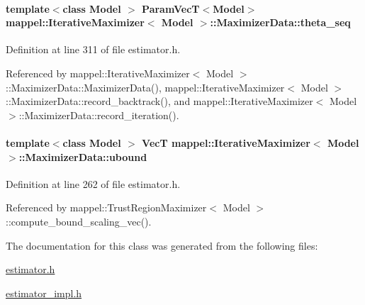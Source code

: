 \paragraph[{\texorpdfstring{theta\+\_\+seq}{theta_seq}}]{\setlength{\rightskip}{0pt plus 5cm}template$<$class Model $>$ {\bf Param\+VecT}$<$Model$>$ {\bf mappel\+::\+Iterative\+Maximizer}$<$ Model $>$\+::Maximizer\+Data\+::theta\+\_\+seq\hspace{0.3cm}{\ttfamily [protected]}}\hypertarget{classmappel_1_1IterativeMaximizer_1_1MaximizerData_a2c8a2c8724b6f507cd8d4a2b6310324f}{}\label{classmappel_1_1IterativeMaximizer_1_1MaximizerData_a2c8a2c8724b6f507cd8d4a2b6310324f}


Definition at line 311 of file estimator.\+h.



Referenced by mappel\+::\+Iterative\+Maximizer$<$ Model $>$\+::\+Maximizer\+Data\+::\+Maximizer\+Data(), mappel\+::\+Iterative\+Maximizer$<$ Model $>$\+::\+Maximizer\+Data\+::record\+\_\+backtrack(), and mappel\+::\+Iterative\+Maximizer$<$ Model $>$\+::\+Maximizer\+Data\+::record\+\_\+iteration().

\paragraph[{\texorpdfstring{ubound}{ubound}}]{\setlength{\rightskip}{0pt plus 5cm}template$<$class Model $>$ {\bf VecT} {\bf mappel\+::\+Iterative\+Maximizer}$<$ Model $>$\+::Maximizer\+Data\+::ubound}\hypertarget{classmappel_1_1IterativeMaximizer_1_1MaximizerData_a222f9843c94b82c5ee9ad7c8af04ab52}{}\label{classmappel_1_1IterativeMaximizer_1_1MaximizerData_a222f9843c94b82c5ee9ad7c8af04ab52}


Definition at line 262 of file estimator.\+h.



Referenced by mappel\+::\+Trust\+Region\+Maximizer$<$ Model $>$\+::compute\+\_\+bound\+\_\+scaling\+\_\+vec().



The documentation for this class was generated from the following files\+:\begin{DoxyCompactItemize}
\item 
\hyperlink{estimator_8h}{estimator.\+h}\item 
\hyperlink{estimator__impl_8h}{estimator\+\_\+impl.\+h}\end{DoxyCompactItemize}
